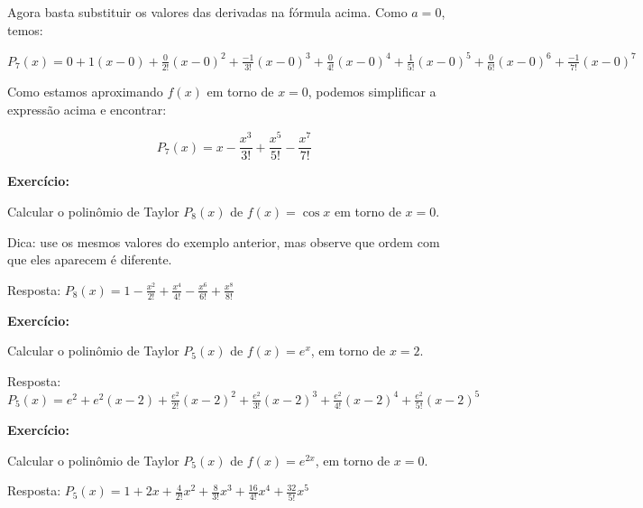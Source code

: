 \documentclass[a4paper]{article}
\begin{document}
Agora basta substituir os valores das derivadas na fórmula acima.
Como $a=0$, temos:

$P_7(x) = 0+ 1(x-0) + \frac{0}{2!}(x-0)^2 + \frac{-1}{3!}(x-0)^3 + \frac{0}{4!}(x-0)^4 + \frac{1}{5!}(x-0)^5 + \frac{0}{6!}(x-0)^6 + \frac{-1}{7!}(x-0)^7$

Como estamos aproximando $f(x)$ em torno de $x=0$, podemos simplificar a expressão acima e encontrar:

\begin{displaymath}
  P_7(x) = x  - \frac{x^3}{3!}  + \frac{x^5}{5!} - \frac{x^7}{7!}
\end{displaymath}

\hrulefill

{\bf Exercício:}

Calcular o polinômio de Taylor $P_8(x)$ de $f(x)=\cos x$ em torno de $x=0$.

Dica: use os mesmos valores do exemplo anterior, mas observe que ordem com que eles aparecem é diferente.

Resposta: $P_8(x) = 1 - \frac{x^2}{2!}  + \frac{x^4}{4!} - \frac{x^6}{6!} + \frac{x^8}{8!}$

\hrulefill

{\bf Exercício:}

Calcular o polinômio de Taylor $P_5(x)$ de $f(x)=e^x$, em torno de $x=2$.

Resposta: $P_5(x) = e^2+ e^2(x-2) + \frac{e^2}{2!}(x-2)^2 + \frac{e^2}{3!}(x-2)^3 + \frac{e^2}{4!}(x-2)^4 + \frac{e^2}{5!}(x-2)^5$

\hrulefill

{\bf Exercício:}

Calcular o polinômio de Taylor $P_5(x)$ de $f(x)=e^{2x}$, em torno de $x=0$.

Resposta: $P_5(x) = 1 + 2x+ \frac{4}{2!}x^2+ \frac{8}{3!}x^3+ \frac{16}{4!}x^4+ \frac{32}{5!}x^5$
\end{document}
